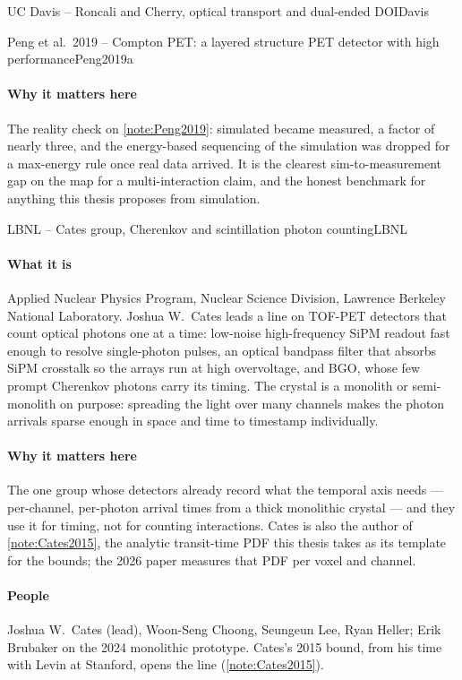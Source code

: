 \begin{programnote}{UC Davis -- Roncali and Cherry, optical transport and dual-ended DOI}{Davis}
\begin{papernote}{Peng et al.\ 2019 -- Compton PET: a layered structure PET detector with high performance}{Peng2019a}
\paragraph{Why it matters here}
The reality check on \ref{note:Peng2019}:  simulated became 
measured, a factor of nearly three, and the energy-based sequencing of the
simulation was dropped for a max-energy rule once real data arrived. It is
the clearest sim-to-measurement gap on the map for a multi-interaction claim,
and the honest benchmark for anything this thesis proposes from simulation.

\end{papernote}

\end{programnote}

\begin{programnote}{LBNL -- Cates group, Cherenkov and scintillation photon counting}{LBNL}

\paragraph{What it is}
Applied Nuclear Physics Program, Nuclear Science Division, Lawrence Berkeley
National Laboratory. Joshua W.\ Cates leads a line on TOF-PET detectors that
count optical photons one at a time: low-noise high-frequency SiPM readout
fast enough to resolve single-photon pulses, an optical bandpass filter that
absorbs SiPM crosstalk so the arrays run at high overvoltage, and BGO, whose
few prompt Cherenkov photons carry its timing. The crystal is a monolith or
semi-monolith on purpose: spreading the light over many channels makes the
photon arrivals sparse enough in space and time to timestamp individually.

\paragraph{Why it matters here}
The one group whose detectors already record what the temporal axis needs ---
per-channel, per-photon arrival times from a thick monolithic crystal --- and
they use it for timing, not for counting interactions. Cates is also the author
of \ref{note:Cates2015}, the analytic transit-time PDF this thesis takes as its
template for the bounds; the 2026 paper measures that PDF per voxel and channel.

\paragraph{People}
Joshua W.\ Cates (lead), Woon-Seng Choong, Seungeun Lee, Ryan Heller; Erik
Brubaker on the 2024 monolithic prototype. Cates's 2015 bound, from his
time with Levin at Stanford, opens the line (\ref{note:Cates2015}).


\end{programnote}
